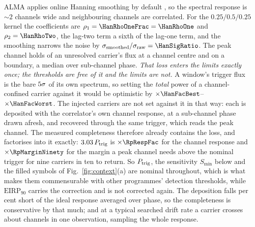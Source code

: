 ALMA applies online Hanning smoothing by default \citep{ALMAHandbook}, so
the spectral response is ${\sim}2$ channels wide and neighbouring channels
are correlated. For the $0.25/0.5/0.25$ kernel the coefficients
are $\rho_1=\HanRhoOneFrac=\HanRhoOne$ and $\rho_2=\HanRhoTwo$, the lag-two
term a sixth of the lag-one term, and the smoothing narrows the noise by
$\sigma_{\rm smoothed}/\sigma_{\rm raw}=\HanSigRatio$. The peak
channel holds \HanBest{} of an unresolved carrier's flux at a channel centre
and \HanWorst{} on a boundary, a median \HanMed{} over sub-channel phase.
\emph{That loss enters the limits exactly once; the thresholds are free of it
and the limits are not.} A window's trigger flux is the
bare $5\sigma$ of its own spectrum, so setting the \emph{total}
power of a channel-confined carrier against it would be optimistic by
$\times\HanFacBest$--$\times\HanFacWorst$. The injected carriers are not set
against it in that way: each is deposited with the correlator's own channel
response, at a sub-channel phase drawn afresh, and recovered through the same
trigger, which reads the peak channel. The measured completeness therefore
already contains the loss, and factorises into it exactly:
$3.03\,P_{\rm trig}$ is $\times\RpRespFac$ for the channel
response and $\times\RpMarginNinety$ for the margin a peak channel needs
above the nominal trigger for nine carriers in ten to return. So
$P_{\rm trig}$, the sensitivity $S_{\min}$ below and the filled symbols of
Fig.~\ref{fig:context}(a) are nominal throughout, which is what makes them
commensurable with other programmes' detection thresholds, while
$\mathrm{EIRP}_{90}$ carries the correction and is not corrected again.
The deposition falls \InjShortPct{} per cent short of the ideal response
averaged over phase, so the completeness is conservative by that much; and
at a typical searched drift rate a carrier crosses about \InjDriftChan{}
channels in one observation, sampling the whole response.

